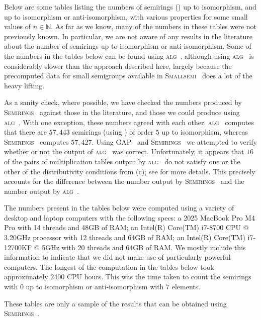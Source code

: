 \documentclass{article}
\newcommand{\cref}[1]{\zcref[S]{#1}}
\theoremstyle{plain}
\theoremstyle{definition}
\newcommand{\GAP}{\textsc{GAP}~\cite{GAP4}\xspace}
\newcommand{\Smallsemi}{\textsc{Smallsemi}~\cite{Smallsemi}\xspace}
\newcommand{\Semirings}{\textsc{Semirings}~\cite{Semirings}\xspace}
\newcommand{\alg}{\textsc{alg}~\cite{baueralg}\xspace}
\begin{document}
Below are some tables listing the numbers of semirings
(\cref{def:semiring}) up
to isomorphism, and up to isomorphism or anti-isomorphism, with various
properties for some small values of $n\in \mathbb{N}$. As far as
we know, many
of the numbers in these tables were not previously known. In
particular, we are
not aware of any results in the literature about the number of
semirings up to
isomorphism or anti-isomorphism. Some of the numbers in the
tables below can
be found using \alg, although using \alg is considerably slower
than the approach described here, largely because the precomputed data for
small semigroups available in \Smallsemi does a lot of the heavy lifting.

As a sanity check, where possible, we have checked the numbers produced by
\Semirings against those in the literature, and those we could produce using
\alg. With one exception, these numbers agreed with each other.
\alg computes
that there are $57,443$ semirings (using \cref{def:semiring}) of
order $5$ up
to isomorphism, whereas \Semirings computes $57,427$. Using \GAP
and \Semirings
we attempted to verify whether or not the output of \alg was correct.
Unfortunately, it appears that $16$ of the pairs of multiplication tables
output by \alg do not satisfy one or the other of the
distributivity conditions
from \cref{def:semiring}(c); see \cite{bauer_alg_issue16} for more details.
This precisely accounts for the difference between the number output by
\Semirings and the number output by \alg.

The numbers present in the tables below were computed using a variety of
desktop and laptop computers with the following specs: a 2025 MacBook Pro M4
Pro with 14 threads and 48GB of RAM; an Intel(R) Core(TM) i7-8700
CPU @ 3.20GHz
processor with 12 threads and 64GB of RAM; an Intel(R) Core(TM)
i7-12700KF @ 5GHz with 20 threads and 64GB of RAM. We mostly include this
information to indicate that we did not make use of particularly powerful
computers. The longest of the computation in the tables below
took approximately $2400$ CPU hours. This was the time taken to count the
semirings with $0$ up to isomorphism or anti-isomorphism with $7$ elements.

These tables are only a sample of the results that can be obtained
using \Semirings.
\end{document}
